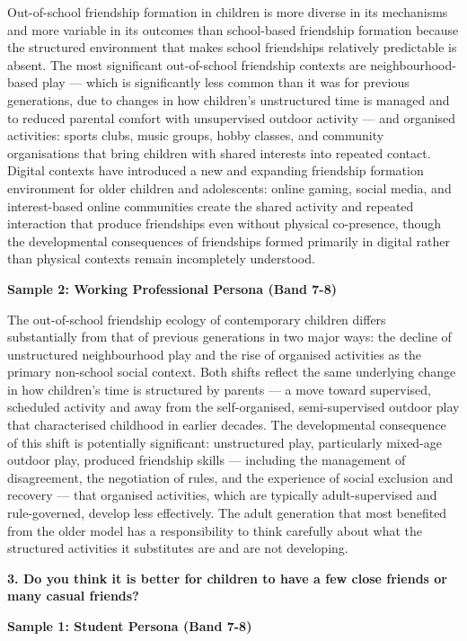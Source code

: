 Out-of-school friendship formation in children is more diverse in its mechanisms and more variable in its outcomes than school-based friendship formation because the structured environment that makes school friendships relatively predictable is absent. The most significant out-of-school friendship contexts are neighbourhood-based play — which is significantly less common than it was for previous generations, due to changes in how children's unstructured time is managed and to reduced parental comfort with unsupervised outdoor activity — and organised activities: sports clubs, music groups, hobby classes, and community organisations that bring children with shared interests into repeated contact. Digital contexts have introduced a new and expanding friendship formation environment for older children and adolescents: online gaming, social media, and interest-based online communities create the shared activity and repeated interaction that produce friendships even without physical co-presence, though the developmental consequences of friendships formed primarily in digital rather than physical contexts remain incompletely understood.

\textbf{Sample 2: Working Professional Persona (Band 7-8)}

The out-of-school friendship ecology of contemporary children differs substantially from that of previous generations in two major ways: the decline of unstructured neighbourhood play and the rise of organised activities as the primary non-school social context. Both shifts reflect the same underlying change in how children's time is structured by parents — a move toward supervised, scheduled activity and away from the self-organised, semi-supervised outdoor play that characterised childhood in earlier decades. The developmental consequence of this shift is potentially significant: unstructured play, particularly mixed-age outdoor play, produced friendship skills — including the management of disagreement, the negotiation of rules, and the experience of social exclusion and recovery — that organised activities, which are typically adult-supervised and rule-governed, develop less effectively. The adult generation that most benefited from the older model has a responsibility to think carefully about what the structured activities it substitutes are and are not developing.

\separator

\begin{ieltsquestion}
\textbf{3. Do you think it is better for children to have a few close friends or many casual friends?}
\end{ieltsquestion}
\textbf{Sample 1: Student Persona (Band 7-8)}

